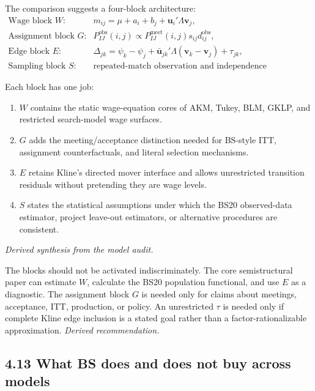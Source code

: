 \documentclass[11pt]{article}
\begin{document}
The comparison suggests a four-block architecture:
\[
\boxed{
\begin{array}{ll}
\text{Wage block \(W\):}
&
m_{ij}=\mu+a_i+b_j+\mathbf u_i'\Lambda\mathbf v_j,\\[0.3em]
\text{Assignment block \(G\):}
&
P^{\mathrm{obs}}_{IJ}(i,j)
\propto
P^{\mathrm{meet}}_{IJ}(i,j)s_{ij}d_{ij}^{\mathrm{obs}},\\[0.3em]
\text{Edge block \(E\):}
&
\Delta_{jk}
=
\psi_k-\psi_j
+\bar{\mathbf u}_{jk}'\Lambda(\mathbf v_k-\mathbf v_j)
+\tau_{jk},\\[0.3em]
\text{Sampling block \(S\):}
&
\text{repeated-match observation and independence conditions.}
\end{array}}
\tag{T4.62}
\]

Each block has one job:

\begin{enumerate}
\item \(W\) contains the static wage-equation cores of AKM, Tukey, BLM, GKLP,
  and restricted search-model wage surfaces.
\item \(G\) adds the meeting/acceptance distinction needed for BS-style ITT,
  assignment counterfactuals, and literal selection mechanisms.
\item \(E\) retains Kline's directed mover interface and allows unrestricted
  transition residuals without pretending they are wage levels.
\item \(S\) states the statistical assumptions under which the BS20
  observed-data estimator, project leave-out estimators, or alternative
  procedures are consistent.
\end{enumerate}

\textit{Derived synthesis from the model audit.}

The blocks should not be activated indiscriminately.  The core
semistructural paper can estimate \(W\), calculate the BS20 population
functional, and use \(E\) as a diagnostic.  The assignment block \(G\) is
needed only for claims about meetings, acceptance, ITT, production, or policy.
An unrestricted \(\tau\) is needed only if complete Kline edge inclusion is a
stated goal rather than a factor-rationalizable approximation.
\textit{Derived recommendation.}

\subsection{4.13 What BS does and does not buy across models}
\end{document}
